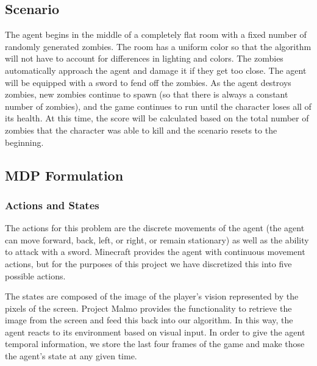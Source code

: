 \documentclass{article}
\begin{document}
\begin{multicols}{2}
\subsection{Scenario}

The agent begins in the middle of a completely flat room with a fixed number of randomly generated zombies. The room has a uniform color so that the algorithm will not have to account for differences in lighting and colors. The zombies automatically approach the agent and damage it if they get too close. The agent will be equipped with a sword to fend off the zombies. As the agent destroys zombies, new zombies continue to spawn (so that there is always a constant number of zombies), and the game continues to run until the character loses all of its health. At this time, the score will be calculated based on the total number of zombies that the character was able to kill and the scenario resets to the beginning.




\subsection{MDP Formulation}



\subsubsection{Actions and States}

The actions for this problem are the discrete movements of the agent (the agent can move forward, back, left, or right, or remain stationary) as well as the ability to attack with a sword.
Minecraft provides the agent with continuous movement actions, but for the purposes of this project we have discretized this into five possible actions.

The states are composed of the image of the player's vision represented by the pixels of the screen. Project Malmo provides the functionality to retrieve the image from the screen and feed this back into our algorithm. In this way, the agent reacts to its environment based on visual input.
In order to give the agent temporal information, we store the last four frames of the game and make those the agent's state at any given time.


\end{multicols}
\end{document}
